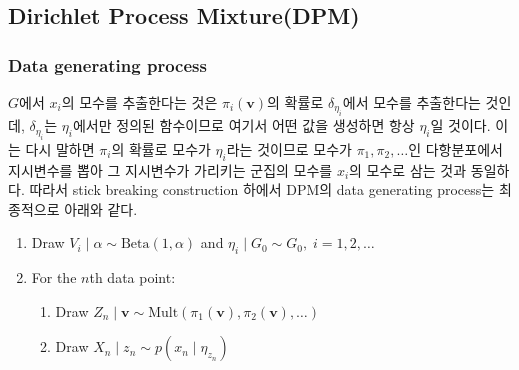 \documentclass{article}
\begin{document}
\subsection{Dirichlet Process Mixture(DPM)}
\subsubsection{Data generating process}
$G$에서 $x_i$의 모수를 추출한다는 것은 $\pi_i(\textbf{v})$의 확률로 $\delta_{\eta_i}$에서 모수를 추출한다는 것인데, $\delta_{\eta_i}$는 $\eta_i$에서만 정의된 함수이므로 여기서 어떤 값을 생성하면 항상 $\eta_i$일 것이다.
이는 다시 말하면 $\pi_i$의 확률로 모수가 $\eta_i$라는 것이므로 모수가 $\pi_1, \pi_2, \ldots$인 다항분포에서 지시변수를 뽑아 그 지시변수가 가리키는 군집의 모수를 $x_i$의 모수로 삼는 것과 동일하다.
따라서 stick breaking construction 하에서 DPM의 data generating process는 최종적으로 아래와 같다.
\begin{enumerate}
    \item Draw $V_i\;|\;\alpha\sim\text{Beta}(1,\alpha)$ and $\eta_{i}\;|\;G_{0} \sim G_{0},\;i=1,2,\ldots$
    \item For the $n$th data point:
    \begin{enumerate}
        \item Draw $Z_n\;|\;\textbf{v}\sim\text{Mult}(\pi_1(\textbf{v}),\pi_2(\textbf{v}),\ldots)$
        \item Draw $X_n\;|\;z_n\sim p(x_n\;|\;\eta_{z_n})$
    \end{enumerate}
\end{enumerate}
\end{document}
